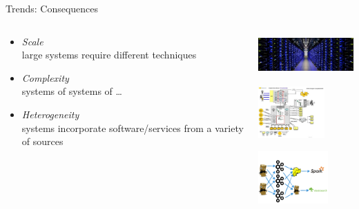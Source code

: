 \documentclass{beamer}
\begin{document}
\begin{frame}{Trends:  Consequences}

  \begin{columns}
    \begin{column}{.5\textwidth}
      \begin{itemize}
      \item \emph{Scale} \\ large systems require different techniques

      \item \emph{Complexity} \\ systems of systems of \ldots

      \item \emph{Heterogeneity} \\ systems incorporate software/services from a variety of sources
      \end{itemize}

    \end{column}
    \begin{column}{.5\textwidth}
      \centering

      \includegraphics[height=1.5cm]{servers.jpg}

      \vspace*{12pt}

      \includegraphics[height=2cm]{system.jpg}

      \vspace*{12pt}

      \includegraphics[height=2cm]{integration.png}
    \end{column}
  \end{columns}

\end{frame}
\end{document}
